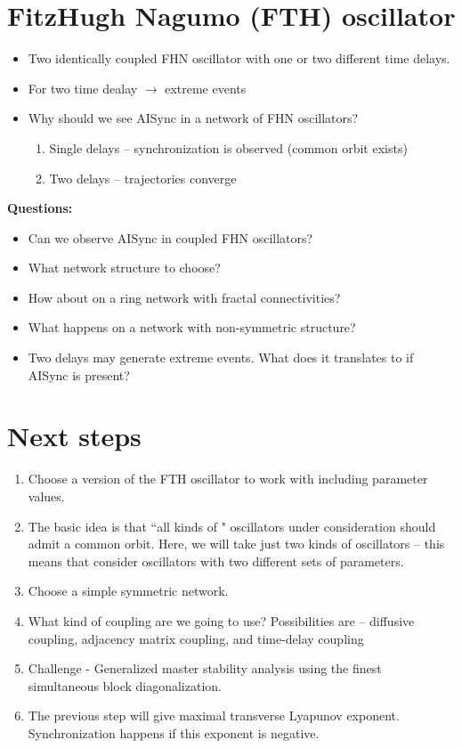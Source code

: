 \documentclass[12pt,a4paper,final]{article}
\begin{document}
\section*{FitzHugh Nagumo (FTH) oscillator}
\begin{itemize}
    \item Two identically coupled FHN oscillator with one or two different 
    time delays.
    \item For two time dealay $\rightarrow$ extreme events
    \item Why should we see AISync in a network of FHN oscillators?
    \begin{enumerate}[label=(\alph*)]
    \item Single delays -- synchronization is observed (common orbit exists)
    \item Two delays -- trajectories converge
    \end{enumerate}
\end{itemize}

\textbf{Questions:}
\begin{itemize}
    \item Can we observe AISync in coupled FHN oscillators? 
    \item What network structure to choose?
    \item How about on a ring network with fractal connectivities?
    \item What happens on a network with non-symmetric structure? 
    \item Two delays may generate extreme events. What does it translates to 
    if AISync is present?
\end{itemize}

\section*{Next steps}
\begin{enumerate}
	\item Choose a version of the FTH oscillator to work with including parameter values. 
	\item The basic idea is that ``all kinds of " oscillators under consideration should admit a common orbit. Here, we will take just two kinds of oscillators -- this means that consider oscillators with two different sets of parameters. 
	\item Choose a simple symmetric network.
	\item What kind of coupling are we going to use? Possibilities are -- diffusive coupling, adjacency matrix coupling, and time-delay coupling  
	\item Challenge - Generalized master stability analysis using the finest simultaneous block diagonalization.
	\item The previous step will give maximal transverse Lyapunov exponent. Synchronization happens if this exponent is negative. 

\end{enumerate}
\end{document}
